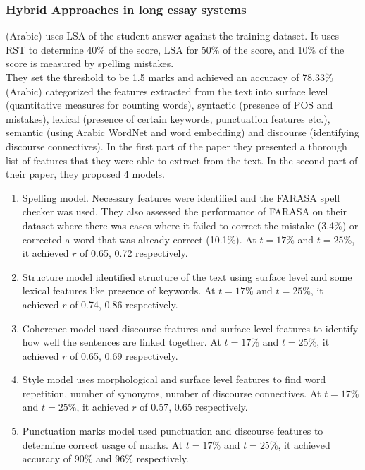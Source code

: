 \documentclass{article}
\begin{document}
	\subsubsection*{Hybrid Approaches in long essay systems}
	\textbf{\textcite{5_aljouie2017schoolchildren}} (Arabic) uses LSA of the student answer against the training dataset. It uses RST to determine 40\% of the score, LSA for 50\% of the score, and 10\% of the score is measured by spelling mistakes. \\ They set the threshold to be 1.5 marks and achieved an accuracy of 78.33\% \\
	
	
	\textbf{\textcite{18_alqahtani2020svr}} (Arabic) categorized the features extracted from the text into surface level (quantitative measures for counting words), syntactic (presence of POS and mistakes), lexical (presence of certain keywords, punctuation features etc.), semantic (using Arabic WordNet and word embedding) and discourse (identifying discourse connectives). In the first part of the paper they presented a thorough list of features that they were able to extract from the text. In the second part of their paper, they proposed 4 models.
	\begin{enumerate}
		\item Spelling model. Necessary features were identified and the FARASA spell checker was used. They also assessed the performance of FARASA on their dataset where there was cases where it failed to correct the mistake (3.4\%) or corrected a word that was already correct (10.1\%). At $t = 17\%$ and $t = 25\%$, it achieved $r$ of 0.65, 0.72 respectively.
		\item Structure model identified structure of the text using surface level and some lexical features like presence of keywords. At $t = 17\%$ and $t = 25\%$, it achieved $r$ of 0.74, 0.86 respectively.
		\item Coherence model used discourse features and surface level features to identify how well the sentences are linked together. At $t = 17\%$ and $t = 25\%$, it achieved $r$ of 0.65, 0.69 respectively.
		\item Style model uses morphological and surface level features to find word repetition, number of synonyms, number of discourse connectives. At $t = 17\%$ and $t = 25\%$, it achieved $r$ of 0.57, 0.65 respectively.
		\item Punctuation marks model used punctuation and discourse features to determine correct usage of marks. At $t = 17\%$ and $t = 25\%$, it achieved accuracy of 90\% and 96\% respectively. 
	\end{enumerate}
\end{document}
